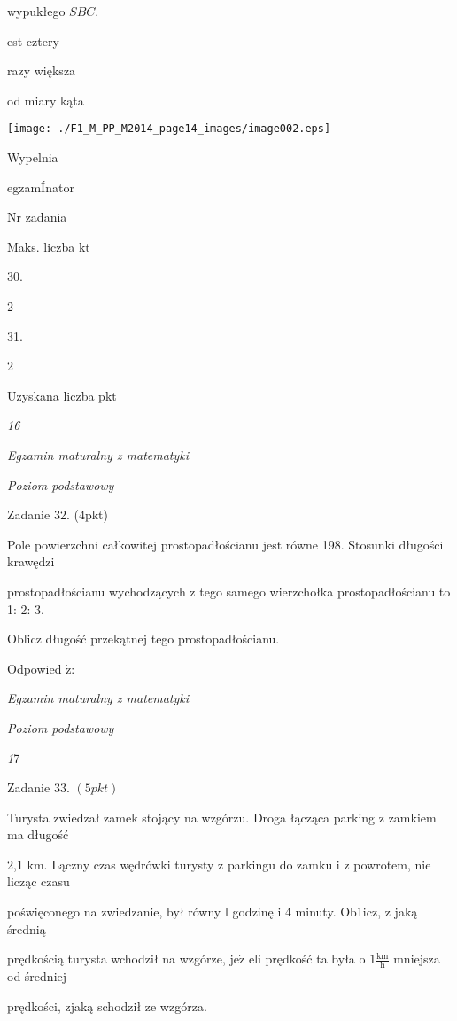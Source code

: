 \documentclass[a4paper,12pt]{article}
\begin{document}
wypukłego $SBC.$

est cztery

razy większa

od miary kąta
\begin{center}
\texttt{[image: ./F1\_M\_PP\_M2014\_page14\_images/image002.eps]}
\end{center}
Wypelnia

egzamÍnator

Nr zadania

Maks. liczba kt

30.

2

31.

2

Uzyskana liczba pkt





{\it 16}

{\it Egzamin maturalny z matematyki}

{\it Poziom podstawowy}

Zadanie 32. (4pkt)

Pole powierzchni całkowitej prostopadłościanu jest równe 198. Stosunki długości krawędzi

prostopadłościanu wychodzących z tego samego wierzchołka prostopadłościanu to 1: 2: 3.

Oblicz długość przekątnej tego prostopadłościanu.

Odpowied $\acute{\mathrm{z}}$:





{\it Egzamin maturalny z matematyki}

{\it Poziom podstawowy}

{\it 1}7

Zadanie 33. $(5pkt)$

Turysta zwiedzał zamek stojący na wzgórzu. Droga łącząca parking z zamkiem ma długość

2,1 km. Lączny czas wędrówki turysty z parkingu do zamku i z powrotem, nie licząc czasu

poświęconego na zwiedzanie, był równy l godzinę i 4 minuty. Ob1icz, z jaką średnią

prędkością turysta wchodził na wzgórze, $\mathrm{j}\mathrm{e}\dot{\mathrm{z}}$ eli prędkość ta była o $1 \displaystyle \frac{\mathrm{k}\mathrm{m}}{\mathrm{h}}$ mniejsza od średniej

prędkości, zjaką schodził ze wzgórza.
\end{document}
